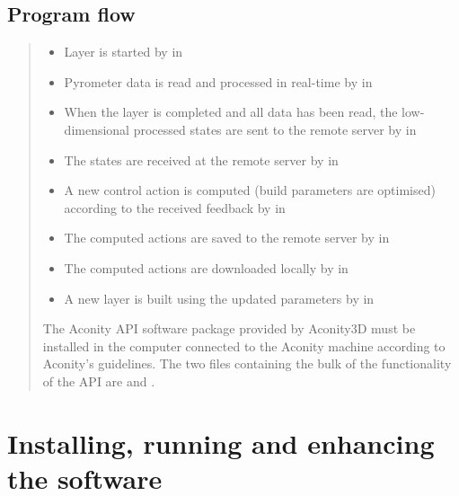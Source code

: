 \documentclass[letterpaper,10pt,english,openany,oneside]{sphinxmanual}
\begin{document}
\section{Program flow}
\label{\detokenize{overview:program-flow}}\begin{quote}
\begin{itemize}
\item {} 
Layer is started by  in 

\item {} 
Pyrometer data is read and processed in real-time by  in 

\item {} 
When the layer is completed and all data has been read, the low-dimensional
processed states are sent to the remote server by  in 

\item {} 
The states are received at the remote server by  in 

\item {} 
A new control action is computed (build parameters are optimised) according
to the received feedback by  in 

\item {} 
The computed actions are saved to the remote server by  in 

\item {} 
The computed actions are downloaded locally by  in 

\item {} 
A new layer is built using the updated parameters by  in 

\end{itemize}

The Aconity API software package provided by Aconity3D must be installed in the
computer connected to the Aconity machine according to Aconity’s guidelines. The
two files containing the bulk of the functionality of the API are 
and .
\end{quote}


\chapter{Installing, running and enhancing the software}
\label{\detokenize{installation:installing-running-and-enhancing-the-software}}\label{\detokenize{installation::doc}}
\end{document}

